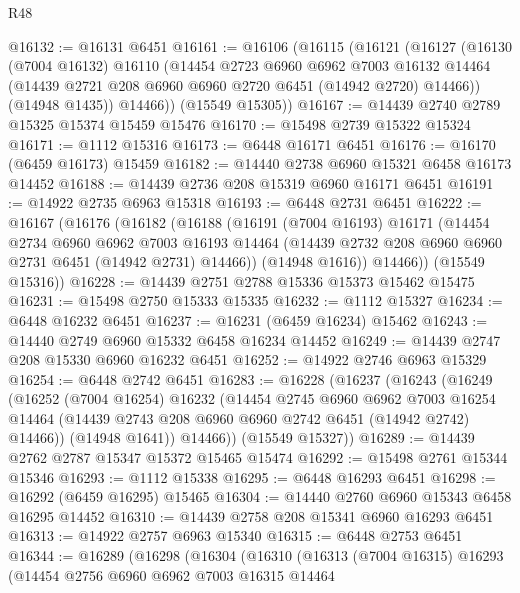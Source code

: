 \begin{lexlean}{R48}
\begin{coremodule}
@16132 := @16131 @6451
@16161 := @16106
    (@16115
      (@16121
        (@16127
          (@16130
            (@7004 @16132)
            @16110
            (@14454
              @2723
              @6960
              @6962
              @7003
              @16132
              @14464
              (@14439 @2721 @208 @6960 @6960 @2720 @6451 (@14942 @2720) @14466))
            (@14948 @1435))
          @14466))
      (@15549 @15305))
@16167 := @14439 @2740 @2789 @15325 @15374 @15459 @15476
@16170 := @15498 @2739 @15322 @15324
@16171 := @1112 @15316
@16173 := @6448 @16171 @6451
@16176 := @16170 (@6459 @16173) @15459
@16182 := @14440 @2738 @6960 @15321 @6458 @16173 @14452
@16188 := @14439 @2736 @208 @15319 @6960 @16171 @6451
@16191 := @14922 @2735 @6963 @15318
@16193 := @6448 @2731 @6451
@16222 := @16167
    (@16176
      (@16182
        (@16188
          (@16191
            (@7004 @16193)
            @16171
            (@14454
              @2734
              @6960
              @6962
              @7003
              @16193
              @14464
              (@14439 @2732 @208 @6960 @6960 @2731 @6451 (@14942 @2731) @14466))
            (@14948 @1616))
          @14466))
      (@15549 @15316))
@16228 := @14439 @2751 @2788 @15336 @15373 @15462 @15475
@16231 := @15498 @2750 @15333 @15335
@16232 := @1112 @15327
@16234 := @6448 @16232 @6451
@16237 := @16231 (@6459 @16234) @15462
@16243 := @14440 @2749 @6960 @15332 @6458 @16234 @14452
@16249 := @14439 @2747 @208 @15330 @6960 @16232 @6451
@16252 := @14922 @2746 @6963 @15329
@16254 := @6448 @2742 @6451
@16283 := @16228
    (@16237
      (@16243
        (@16249
          (@16252
            (@7004 @16254)
            @16232
            (@14454
              @2745
              @6960
              @6962
              @7003
              @16254
              @14464
              (@14439 @2743 @208 @6960 @6960 @2742 @6451 (@14942 @2742) @14466))
            (@14948 @1641))
          @14466))
      (@15549 @15327))
@16289 := @14439 @2762 @2787 @15347 @15372 @15465 @15474
@16292 := @15498 @2761 @15344 @15346
@16293 := @1112 @15338
@16295 := @6448 @16293 @6451
@16298 := @16292 (@6459 @16295) @15465
@16304 := @14440 @2760 @6960 @15343 @6458 @16295 @14452
@16310 := @14439 @2758 @208 @15341 @6960 @16293 @6451
@16313 := @14922 @2757 @6963 @15340
@16315 := @6448 @2753 @6451
@16344 := @16289
    (@16298
      (@16304
        (@16310
          (@16313
            (@7004 @16315)
            @16293
            (@14454
              @2756
              @6960
              @6962
              @7003
              @16315
              @14464

\end{coremodule}
\end{lexlean}
